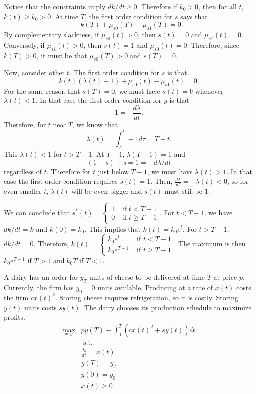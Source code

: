 \begin{example}
  Notice that the constraints imply $dk/dt \geq 0$. Therefore if
  $k_0>0$, then for all $t$, $k(t) \geq k_0 > 0$.   
  At time $T$, the first order condition for $s$ says that
  \[ -k(T) + \mu_{s0}(T) - \mu_{s1}(T) = 0. \]
  By complementary slackness, if $\mu_{s0}(t) > 0$, then
  $s(t) = 0$ and $\mu_{s1}(t) = 0$. Conversely, if $\mu_{s1}(t) > 0$,
  then $s(t) = 1$ and $\mu_{s0}(t) = 0$.  Therefore, since $k(T) > 0$, it
  must be that $\mu_{s0}(T) > 0$ and $s(T) = 0$.  

  Now, consider other $t$. The first order condition for $s$ is that
  \[ k(t)(\lambda(t) - 1) + \mu_{s0}(t) - \mu_{s1}(t) = 0. \]
  For the same reason that $s(T) = 0$, we must have $s(t) = 0$
  whenever $\lambda(t) < 1$. In that case the first order condition
  for $y$ is that 
  \[ 1 = -\frac{d\lambda}{dt}. \]
  Therefore, for $t$ near $T$, we know that
  \[ \lambda(t) = \int_T^t -1 d\tau = T - t. \]
  This $\lambda(t) < 1$ for $t > T-1$. At $T-1$, $\lambda(T-1) = 1$
  and 
  \[ (1-s) + s = 1 = -d\lambda/dt \]
  regardless of $t$. Therefore for $t$ just below $T-1$, we must have
  $\lambda(t)>1$. In that case the first order condition requires
  $s(t) = 1$. Then, $\frac{d\lambda}{dt} = -\lambda(t) < 0$, so for
  even smaller $t$, $\lambda(t)$ will be even bigger and $s(t)$ must
  still be $1$. 
  
  We can conclude that 
  $s^*(t) = \begin{cases} 1 & \text{ if } t 
    < T - 1 \\ 
    0 & \text{ if } t \geq T-1 \end{cases}$. For $t<T-1$, we have
  $dk/dt = k$ and $k(0) = k_0$. This implies that $k(t) = k_0
  e^t$. For $t>T-1$, $dk/dt = 0$. Therefore,
  $k(t) = \begin{cases} k_0 e^t & \text{ if } t<T-1 \\
   k_0 e^{T-1} & \text{ if } t \geq T-1 \end{cases}$. The maximum is then
  $k_0 e^{T-1}$ if $T>1$ and $k_0 T$ if $T<1$.   
\end{example}

\begin{example}[Inventory]
  A dairy has an order for $y_T$ units of cheese to be delivered at
  time $T$ at price $p$. Currently, the firm has $y_0 = 0$ units
  available. Producing at a rate of $x(t)$ costs the firm $c
  x(t)^2$. Storing cheese requires refrigeration, so it is
  costly. Storing $y(t)$ units costs $sy(t)$. The dairy chooses its
  production schedule to maximize profits. 
  \begin{align*}
    \max_{x,y} & p y(T) - \int_0^T \left( c x(t)^2  + s y(t) \right)
    dt \\
    & \text{ s.t. } \\
    & \frac{dy}{dt} = x(t) \\
    & y(T) = y_T \\
    & y(0) = y_0 \\
    & x(t) \geq 0 
  \end{align*}
\end{example}

